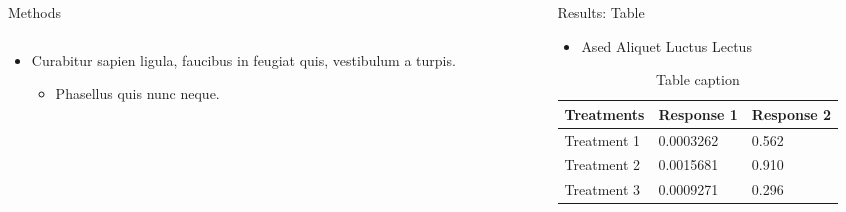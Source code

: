 \documentclass[final,hyperref={pdfpagelabels=false}]{beamer}
\begin{document}
\begin{frame}[t]
\begin{columns}[t]
\begin{column}{.465\textwidth}
\begin{block}{Methods}
\begin{columns}
\end{columns} %

\begin{itemize}
\item Curabitur sapien ligula, faucibus in feugiat quis, vestibulum a turpis.
\begin{itemize}
\item Phasellus quis nunc neque.
\end{itemize}
\end{itemize}

\end{block}


\end{column} %

\begin{column}{.03\textwidth}\end{column} %
 
\begin{column}{.465\textwidth} %


\begin{block}{Results: Table}

\begin{itemize}
\item Ased Aliquet Luctus Lectus
\end{itemize}

\begin{table}
\begin{tabular}{l l l}
\toprule
\textbf{Treatments} & \textbf{Response 1} & \textbf{Response 2}\\
\midrule
Treatment 1 & 0.0003262 & 0.562 \\
Treatment 2 & 0.0015681 & 0.910 \\
Treatment 3 & 0.0009271 & 0.296 \\
\bottomrule
\end{tabular}
\caption{Table caption}
\end{table}


\end{block}
\end{column}
\end{columns}
\end{frame}
\end{document}
